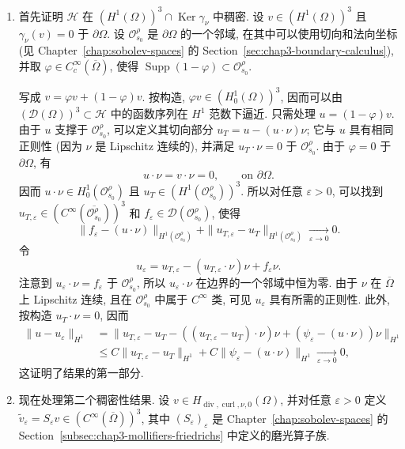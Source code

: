 \begin{Proof}
\begin{enumerate}
 \item 首先证明 $\mathcal H$ 在 $(H^1(\Omega))^3\cap\operatorname{Ker}\gamma_\nu$ 中稠密. 设
 $v\in(H^1(\Omega))^3$ 且 $\gamma_\nu(v)=0$ 于 $\partial\Omega$. 设
 $\mathcal O_{s_0}^{\rho}$ 是 $\partial\Omega$ 的一个邻域, 在其中可以使用切向和法向坐标
 (见 Chapter~\ref{chap:sobolev-spaces} 的 Section~\ref{sec:chap3-boundary-calculus}), 并取
 $\varphi\in C_c^\infty(\overline\Omega)$, 使得
 $\operatorname{Supp}(1-\varphi)\subset\mathcal O_{s_0}^{\rho}$.

 写成 $v=\varphi v+(1-\varphi)v$. 按构造, $\varphi v\in(H_0^1(\Omega))^3$, 因而可以由
 $(\mathcal D(\Omega))^3\subset\mathcal H$ 中的函数序列在 $H^1$ 范数下逼近. 只需处理
 $u=(1-\varphi)v$. 由于 $u$ 支撑于 $\mathcal O_{s_0}^{\rho}$, 可以定义其切向部分
 $u_T=u-(u\cdot\nu)\nu$; 它与 $u$ 具有相同正则性 (因为 $\nu$ 是 Lipschitz 连续的), 并满足
 $u_T\cdot\nu=0$ 于 $\mathcal O_{s_0}^{\rho}$. 由于 $\varphi=0$ 于 $\partial\Omega$, 有
 \[
  u\cdot\nu=v\cdot\nu=0,\qquad\text{on }\partial\Omega.
 \]
 因而 $u\cdot\nu\in H_0^1(\mathcal O_{s_0}^{\rho})$ 且
 $u_T\in(H^1(\mathcal O_{s_0}^{\rho}))^3$. 所以对任意 $\varepsilon>0$, 可以找到
 $u_{T,\varepsilon}\in(C^\infty(\overline{\mathcal O_{s_0}^{\rho}}))^3$ 和
 $f_\varepsilon\in\mathcal D(\mathcal O_{s_0}^{\rho})$, 使得
 \[
  \|f_\varepsilon-(u\cdot\nu)\|_{H^1(\mathcal O_{s_0}^{\rho})}
  +\|u_{T,\varepsilon}-u_T\|_{H^1(\mathcal O_{s_0}^{\rho})}
  \underset{\varepsilon\to0}{\longrightarrow}0.
 \]
 令
 \[
  u_\varepsilon=u_{T,\varepsilon}-(u_{T,\varepsilon}\cdot\nu)\nu+f_\varepsilon\nu.
 \]
 注意到 $u_\varepsilon\cdot\nu=f_\varepsilon$ 于 $\mathcal O_{s_0}^{\rho}$, 所以
 $u_\varepsilon\cdot\nu$ 在边界的一个邻域中恒为零. 由于 $\nu$ 在 $\overline\Omega$ 上 Lipschitz 连续,
 且在 $\mathcal O_{s_0}^{\rho}$ 中属于 $C^\infty$ 类, 可见 $u_\varepsilon$ 具有所需的正则性.
 此外, 按构造 $u_T\cdot\nu=0$, 因而
 \[
  \begin{aligned}
  \|u-u_\varepsilon\|_{H^1}
  &=\|u_{T,\varepsilon}-u_T-((u_{T,\varepsilon}-u_T)\cdot\nu)\nu
    +(\psi_\varepsilon-(u\cdot\nu))\nu\|_{H^1}\\
  &\leq C\|u_{T,\varepsilon}-u_T\|_{H^1}
    +C\|\psi_\varepsilon-(u\cdot\nu)\|_{H^1}
    \underset{\varepsilon\to0}{\longrightarrow}0,
  \end{aligned}
 \]
 这证明了结果的第一部分.

 \item 现在处理第二个稠密性结果. 设
 $v\in H_{\operatorname{div},\operatorname{curl},\nu,0}(\Omega)$, 并对任意 $\varepsilon>0$ 定义
 $\widetilde v_\varepsilon=S_\varepsilon v\in(C^\infty(\overline\Omega))^3$, 其中
 $(S_\varepsilon)_\varepsilon$ 是 Chapter~\ref{chap:sobolev-spaces} 的
 Section~\ref{subsec:chap3-mollifiers-friedrichs} 中定义的磨光算子族.


\end{enumerate}
\end{Proof}
